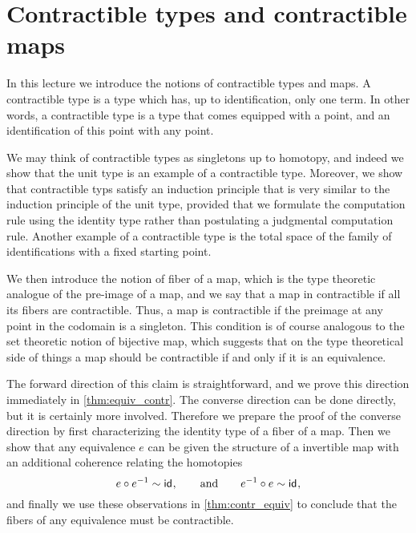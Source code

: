 
\chapter{Contractible types and contractible maps}

In this lecture we introduce the notions of contractible types and maps. A contractible type is a type which has, up to identification, only one term. In other words, a contractible type is a type that comes equipped with a point, and an identification of this point with any point.

We may think of contractible types as singletons up to homotopy, and indeed we show that the unit type is an example of a contractible type. Moreover, we show that contractible typs satisfy an induction principle that is very similar to the induction principle of the unit type, provided that we formulate the computation rule using the identity type rather than postulating a judgmental computation rule. Another example of a contractible type is the total space of the family of identifications with a fixed starting point.

We then introduce the notion of fiber of a map, which is the type theoretic analogue of the pre-image of a map, and we say that a map in contractible if all its fibers are contractible. Thus, a map is contractible if the preimage at any point in the codomain is a singleton. This condition is of course analogous to the set theoretic notion of bijective map, which suggests that on the type theoretical side of things a map should be contractible if and only if it is an equivalence.

The forward direction of this claim is straightforward, and we prove this direction immediately in \cref{thm:equiv_contr}. The converse direction can be done directly, but it is certainly more involved. Therefore we prepare the proof of the converse direction by first characterizing the identity type of a fiber of a map. Then we show that any equivalence $e$ can be given the structure of a invertible map with an additional coherence relating the homotopies
\begin{equation*}
  e\circ e^{-1}\sim \mathsf{id}_{},\qquad\text{and}\qquad e^{-1}\circ e\sim\mathsf{id}_{},
\end{equation*}
and finally we use these observations in \cref{thm:contr_equiv} to conclude that the fibers of any equivalence must be contractible.

